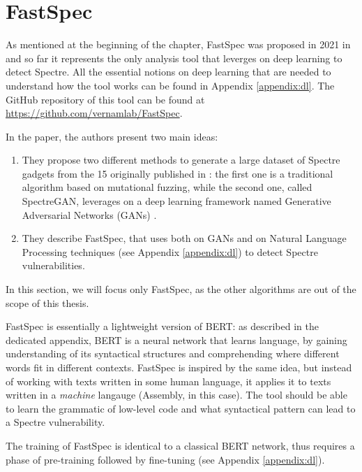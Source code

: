 \documentclass[12pt,a4paper]{book}
\theoremstyle{definition}
\begin{document}
	\section{FastSpec}\label{sec:fastspec}
	As mentioned at the beginning of the chapter, FastSpec was proposed in 2021 in \cite{Tol2021} and so far it represents the only analysis tool that leverges on deep learning to detect Spectre. All the essential notions on deep learning that are needed to understand how the tool works can be found in Appendix \ref{appendix:dl}. The GitHub repository of this tool can be found at \url{https://github.com/vernamlab/FastSpec}. 
	
	In the paper, the authors present two main ideas: 
	\begin{enumerate}
		\item They propose two different methods to generate a large dataset of Spectre gadgets from the 15 originally published in \cite{Kocher2018}: the first one is a traditional algorithm based on mutational fuzzing, while the second one, called SpectreGAN, leverages on a deep learning framework named Generative Adversarial Networks (GANs) \cite{Goodfellow2014}.
		\item They describe FastSpec, that uses both on GANs and on Natural Language Processing techniques (see Appendix \ref{appendix:dl}) to detect Spectre vulnerabilities.
	\end{enumerate}

	In this section, we will focus only FastSpec, as the other algorithms are out of the scope of this thesis.
	
	FastSpec is essentially a lightweight version of BERT: as described in the dedicated appendix, BERT is a neural network that learns language, by gaining understanding of its syntactical structures and comprehending where different words fit in different contexts. FastSpec is inspired by the same idea, but instead of working with texts written in some human language, it applies it to texts written in a \textit{machine} langauge (Assembly, in this case). The tool should be able to learn the grammatic of low-level code and what syntactical pattern can lead to a Spectre vulnerability.
	
	The training of FastSpec is identical to a classical BERT network, thus requires a phase of pre-training followed by fine-tuning (see Appendix \ref{appendix:dl}).
	
\end{document}
